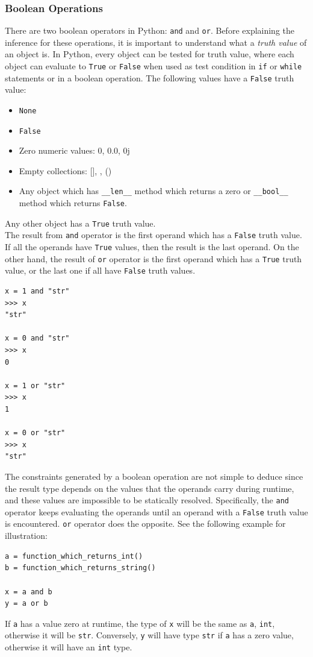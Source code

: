 \subsubsection{Boolean Operations}
There are two boolean operators in Python: \lstinline|and| and \lstinline|or|. Before explaining the inference for these operations, it is important to understand what a \textit{truth value} of an object is. In Python, every object can be tested for truth value, where each object can evaluate to \lstinline|True| or \lstinline|False| when used as test condition in \lstinline|if| or \lstinline|while| statements or in a boolean operation. The following values have a \lstinline|False| truth value:
\begin{itemize}
	\item \lstinline|None|
	\item \lstinline|False|
	\item Zero numeric values: 0, 0.0, 0j
	\item Empty collections: [], {}, ()
	\item Any object which has \lstinline|__len__| method which returns a zero or \lstinline|__bool__| method which returns \lstinline|False|.
\end{itemize}
Any other object has a \lstinline|True| truth value. \\

The result from \lstinline|and| operator is the first operand which has a \lstinline|False| truth value. If all the operands have \lstinline|True| values, then the result is the last operand. On the other hand, the result of \lstinline|or| operator is the first operand which has a \lstinline|True| truth value, or the last one if all have \lstinline|False| truth values.

\begin{lstlisting}
x = 1 and "str"
>>> x
"str"

x = 0 and "str"
>>> x
0

x = 1 or "str"
>>> x
1

x = 0 or "str"
>>> x
"str"
\end{lstlisting}

The constraints generated by a boolean operation are not simple to deduce since the result type depends on the values that the operands carry during runtime, and these values are impossible to be statically resolved. Specifically, the \lstinline|and| operator keeps evaluating the operands until an operand with a \lstinline|False| truth value is encountered. \lstinline|or| operator does the opposite. See the following example for illustration:
\begin{lstlisting}
a = function_which_returns_int()
b = function_which_returns_string()

x = a and b
y = a or b
\end{lstlisting}
If \lstinline|a| has a value zero at runtime, the type of \lstinline|x| will be the same as \lstinline|a|, \lstinline|int|, otherwise it will be \lstinline|str|. Conversely, \lstinline|y| will have type \lstinline|str| if \lstinline|a| has a zero value, otherwise it will have an \lstinline|int| type.

